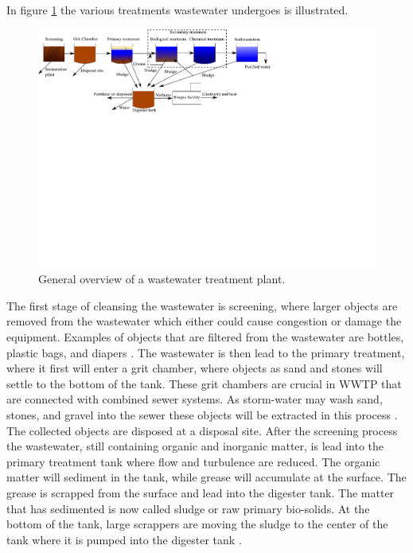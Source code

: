 In figure \ref{fig:wwtp_process} the various treatments wastewater undergoes is illustrated. 
\begin{figure}[H]
\centering
\includegraphics[clip, trim=0cm 13cm 9cm 0cm, width=1.00\textwidth]{report/introduction/pictures/WWTP_overview}
\caption{General overview of a wastewater treatment plant.}
\label{fig:wwtp_process}
\end{figure}

The first stage of cleansing the wastewater is screening, where larger objects are removed from the wastewater which either could cause congestion or damage the equipment. Examples of objects that are filtered from the wastewater are bottles, plastic bags, and diapers \cite{wwtp_process}. %
The wastewater is then lead to the primary treatment, where it first will enter a grit chamber, where objects as sand and stones will settle to the bottom of the tank. These grit chambers are crucial in WWTP that are connected with combined sewer systems. %
As storm-water may wash sand, stones, and gravel into the sewer these objects will be extracted in this process \cite{epa_wwtp}. The collected objects are disposed at a disposal site. 
After the screening process the wastewater, still containing organic and inorganic matter, is lead into the primary treatment tank where flow and turbulence are reduced.
The organic matter will sediment in the tank, while grease will accumulate at the surface. 
The grease is scrapped from the surface and lead into the digester tank. The matter that has sedimented is now called sludge or raw primary bio-solids. At the bottom of the tank, large scrappers are moving the sludge to the center of the tank where it is pumped into the digester tank \cite{epa_wwtp}.%

